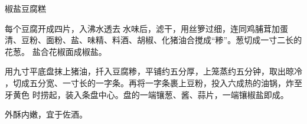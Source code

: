 \begin{recipe}{椒盐豆腐糕}

\ingredients


\preparation

\step 每个豆腐开成四片，入沸水透去𥑲水味后，滤干，用丝箩过细，连同鸡脯茸加蛋
清、豆粉、面粉、盐、味精、料酒、胡椒、化猪油合搅成“糁”。葱切成一寸二长的花葱。
盐合花椒面成椒盐。

\step 用九寸平底盘抹上猪油，扦入豆腐糁，平铺约五分厚，上笼蒸约五分钟，取出晾冷
，切成五分宽、一寸长的一字条。再将一字条裹上豆粉，投入六成热的油锅，炸至牙黄色
时捞起，装入条盘中心。盘的一端镶葱、酱、蒜片，一端镶椒盐即成。

\features

外酥内嫩，宜于佐酒。

\end{recipe}


